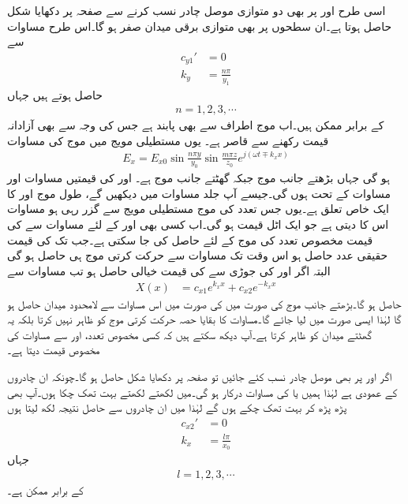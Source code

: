 اسی طرح  اور  پر بھی دو متوازی موصل چادر نسب کرنے سے صفحہ  پر دکھایا شکل  حاصل ہوتا ہے۔ان سطحوں پر بھی متوازی برقی میدان صفر ہو گا۔اس طرح مساوات  سے
\begin{align}
c_{y1}'&=0\\
k_y &=\frac{n \pi}{y_1}\label{مساوات_مویج_میکس_ویل_عمومی_مستطیلی_شرط_ب}
\end{align}
حاصل ہوتے ہیں جہاں
\begin{align}
n=1,2,3,\cdots
\end{align}
کے برابر ممکن ہیں۔اب موج  اطراف سے بھی  پابند ہے جس کی وجہ سے  بھی آزادانہ قیمت رکھنے سے قاصر ہے۔ یوں مستطیلی مویج میں موج کی مساوات 
\begin{align}
E_x=E_{x0} \sin \frac{n\pi y}{y_0} \sin \frac{m\pi z}{z_0} e^{j(\omega t \mp k_x x)}
\end{align}
ہو گی جہاں  بڑھتے  جانب موج جبکہ  گھٹتے  جانب موج ہے۔  اور  کی قیمتیں مساوات  اور مساوات  کے تحت ہوں گی۔جیسے آپ جلد مساوات  میں دیکھیں گے، طول موج اور  کا ایک خاص تعلق ہے۔یوں جس تعدد کی موج مستطیلی مویج سے گزر رہی ہو مساوات  اس کا  دیتی ہے جو ایک  اٹل قیمت ہو گی۔اب کسی بھی  اور  کے لئے مساوات  سے  کی قیمت مخصوص تعدد کی موج کے لئے حاصل کی جا سکتی ہے۔جب تک  کی قیمت حقیقی عدد حاصل ہو اس وقت تک مساوات  سے  حرکت کرتی موج ہی حاصل ہو گی البتہ اگر   اور  کی جوڑی سے  کی قیمت خیالی حاصل ہو تب مساوات    سے
\begin{align*}
X(x)&=c_{x1}e^{k_x x}+c_{x2}e^{ - k_x x} 
\end{align*}
حاصل ہو گا۔بڑھتے  جانب موج  کی صورت میں  کی صورت میں اس مساوات سے لامحدود میدان حاصل ہو گا لہٰذا ایسی صورت میں  لیا جائے گا۔مساوات کا بقایا حصہ حرکت کرتی موج کو ظاہر نہیں کرتا بلکہ یہ گھٹتے میدان کو ظاہر کرتا ہے۔آپ دیکھ سکتے ہیں کہ کسی مخصوص تعدد،  اور 
 سے مساوات   کی مخصوص قیمت دیتا ہے۔ 

اگر  اور  پر بھی موصل چادر نسب کئے جائیں تو صفحہ  پر دکھایا شکل  حاصل ہو گا۔چونکہ  ان چادروں کے عمودی ہے لہٰذا ہمیں  یا  کی مساوات درکار ہو گی۔میں لکھتے لکھتے بہت تھک  چکا ہوں۔آپ بھی پڑھ پڑھ کر بہت تھک چکے ہوں گے لہٰذا میں ان چادروں سے حاصل نتیجہ لکھ لیتا ہوں
\begin{align}
c_{x2}'&=0\\
k_x&=\frac{l\pi}{x_0}
\end{align} 
جہاں
\begin{align}
l=1,2,3,\cdots
\end{align}
کے برابر ممکن ہے۔

